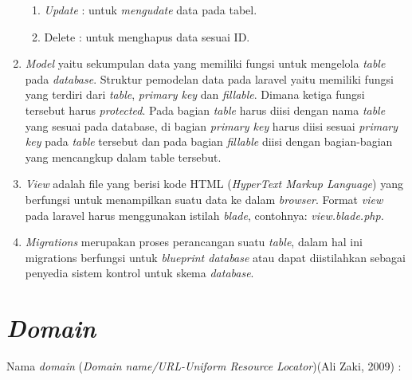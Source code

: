 \begin{enumerate}
\begin{enumerate}
\item \textit{Update} \kern 0pc : untuk \textit{mengudate} data pada tabel.

\item Delete \kern 0.3pc : untuk menghapus data sesuai ID.
\end{enumerate}

\item \textit{Model} yaitu sekumpulan data yang memiliki fungsi untuk mengelola \textit{table} pada \textit{database}. Struktur pemodelan data pada laravel yaitu memiliki fungsi yang terdiri dari \textit{table}, \textit{primary key} dan \textit{fillable}. Dimana ketiga fungsi tersebut harus \textit{protected}. Pada bagian \textit{table} harus diisi dengan nama \textit{table} yang sesuai pada database, di bagian \textit{primary key} harus diisi sesuai \textit{primary key} pada \textit{table} tersebut dan pada bagian \textit{fillable} diisi dengan bagian-bagian yang mencangkup dalam table tersebut.

\item \textit{View} adalah file yang berisi kode HTML (\textit{HyperText Markup Language}) yang berfungsi untuk menampilkan suatu data ke dalam \textit{browser}. Format \textit{view} pada laravel harus menggunakan istilah \textit{blade}, contohnya: \textit{view.blade.php.
}
\item \textit{Migrations} merupakan proses perancangan suatu \textit{table}, dalam hal ini migrations berfungsi untuk \textit{blueprint database} atau dapat diistilahkan sebagai penyedia sistem kontrol untuk skema \textit{database}. 

\end{enumerate}

\section{\textit{Domain}}

Nama \textit{domain} (\textit{Domain name/URL-Uniform Resource Locator})(Ali Zaki, 2009) \cite{7} :

